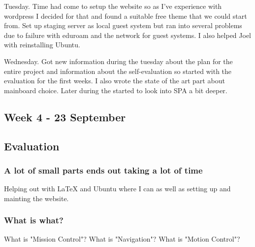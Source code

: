 Tuesday. Time had come to setup the website so as I've experience with
wordpress I decided for that and found a suitable free theme that we could
start from. Set up staging server as local guest system but ran into several
problems due to failure with eduroam and the network for guest systems. I also
helped Joel with reinstalling Ubuntu.

Wednesday. Got new information during the tuesday about the plan for the entire
project and information about the self-evaluation so started with the
evaluation for the first weeks. I also wrote the state of the art part about
mainboard choice. Later during the started to look into SPA a bit deeper.
\subsection{Week 4 - 23 September}\label{week_4}
\subsection{Evaluation}\label{first_period_evaluation}
\subsubsection{A lot of small parts ends out taking a lot of time}
Helping out with LaTeX and Ubuntu where I can as well as setting up and
mainting the website.

\subsubsection{What is what?}
What is "Mission Control"? What is "Navigation"? What is "Motion Control"?
